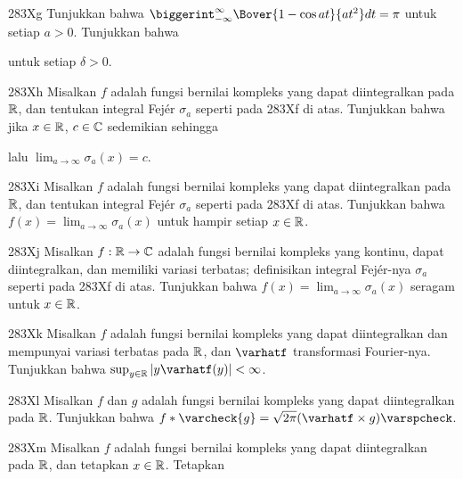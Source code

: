 {\spheader 283Xg Tunjukkan bahwa
$\biggerint_{-\infty}^{\infty}\Bover{1-\cos at}{at^2}dt=\pi$ untuk setiap
$a>0$.  Tunjukkan bahwa


\noindent untuk setiap $\delta>0$.


\spheader 283Xh Misalkan $f$ adalah fungsi bernilai kompleks yang dapat diintegralkan
pada $\Bbb R$, dan tentukan integral Fej\'er $\sigma_a$ seperti pada 283Xf
di atas.   Tunjukkan bahwa jika $x\in\Bbb R$, $c\in\Bbb C$ sedemikian sehingga


\noindent lalu $\lim_{a\to\infty}\sigma_a(x)=c$.   

\sqheader 283Xi Misalkan $f$ adalah fungsi bernilai kompleks yang dapat diintegralkan
pada $\Bbb R$, dan tentukan integral Fej\'er $\sigma_a$ seperti pada 283Xf
di atas.   Tunjukkan bahwa $f(x)=\lim_{a\to\infty}\sigma_a(x)$ untuk hampir setiap
$x\in\Bbb R$.

\spheader 283Xj Misalkan $f:\Bbb R\to\Bbb C$ adalah fungsi bernilai kompleks
yang kontinu, dapat diintegralkan, dan memiliki variasi terbatas; definisikan
integral Fej\'er-nya $\sigma_a$ seperti pada 283Xf di atas. Tunjukkan bahwa
$f(x)=\lim_{a\to\infty}\sigma_a(x)$ seragam untuk $x\in\Bbb R$.

\sqheader 283Xk Misalkan $f$ adalah fungsi bernilai kompleks yang dapat diintegralkan dan
mempunyai variasi terbatas pada $\Bbb R$, dan $\varhatf$ transformasi Fourier-nya.
Tunjukkan bahwa $\sup_{y\in\Bbb R}|y\varhatf(y)|<\infty$.

\spheader 283Xl Misalkan $f$ dan $g$ adalah fungsi
bernilai kompleks yang dapat diintegralkan pada $\Bbb R$.   Tunjukkan bahwa
$f*\varcheck{g}=\sqrt{2\pi}(\varhatf\times g)\varspcheck$.

\spheader 283Xm Misalkan $f$ adalah fungsi bernilai kompleks yang dapat diintegralkan
pada $\Bbb R$, dan tetapkan $x\in\Bbb R$.    Tetapkan


}
